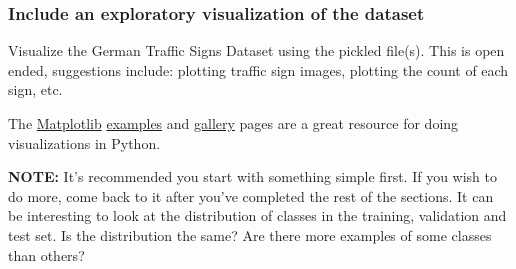 \documentclass[11pt]{article}
\begin{document}
    \hypertarget{include-an-exploratory-visualization-of-the-dataset}{%
\subsubsection{Include an exploratory visualization of the
dataset}\label{include-an-exploratory-visualization-of-the-dataset}}

    Visualize the German Traffic Signs Dataset using the pickled file(s).
This is open ended, suggestions include: plotting traffic sign images,
plotting the count of each sign, etc.

The \href{http://matplotlib.org/}{Matplotlib}
\href{http://matplotlib.org/examples/index.html}{examples} and
\href{http://matplotlib.org/gallery.html}{gallery} pages are a great
resource for doing visualizations in Python.

\textbf{NOTE:} It's recommended you start with something simple first.
If you wish to do more, come back to it after you've completed the rest
of the sections. It can be interesting to look at the distribution of
classes in the training, validation and test set. Is the distribution
the same? Are there more examples of some classes than others?
\end{document}

